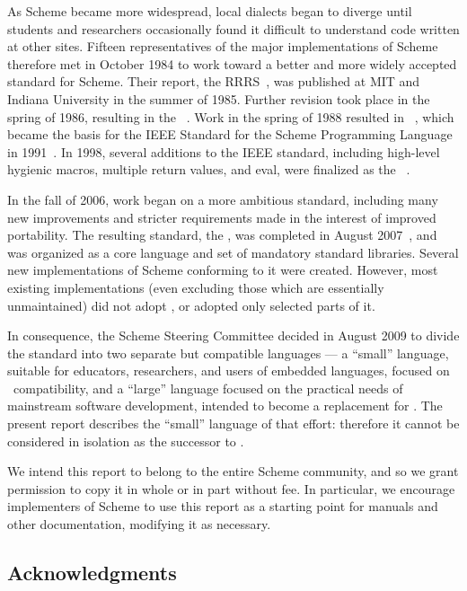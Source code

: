 \vest As Scheme became more widespread,
local dialects began to diverge until students and researchers
occasionally found it difficult to understand code written at other
sites.
Fifteen representatives of the major implementations of Scheme therefore
met in October 1984 to work toward a better and more widely accepted
standard for Scheme.
Their report, the RRRS~\cite{RRRS},
was published at MIT and Indiana University in the summer of 1985.
Further revision took place in the spring of 1986, resulting in the
\rthreers~\cite{R3RS}.
Work in the spring of 1988 resulted in \rfourrs~\cite{R4RS},
which became the basis for the
IEEE Standard for the Scheme Programming Language in 1991~\cite{IEEEScheme}.
In 1998, several additions to the IEEE standard, including high-level
hygienic macros, multiple return values, and {\cf eval}, were finalized
as the \rfivers~\cite{R5RS}.

In the fall of 2006, work began on a more ambitious standard,
including many new improvements and stricter requirements made in the
interest of improved portability.  The resulting standard, the
\rsixrs, was completed in August 2007~\cite{R6RS}, and was organized
as a core language and set of mandatory standard libraries.
Several new implementations of Scheme conforming to it were created.
However, most existing \rfivers{} implementations (even excluding those
which are essentially unmaintained) did not adopt \rsixrs, or adopted
only selected parts of it.

In consequence, the Scheme Steering Committee decided in August 2009 to divide the
standard into two separate but compatible languages --- a ``small''
language, suitable for educators, researchers, and users of embedded languages,
focused on \rfivers~compatibility, and a ``large'' language focused
on the practical needs of mainstream software development,
intended to become a replacement for \rsixrs.
The present report describes the ``small'' language of that effort:
therefore it cannot be considered in isolation as the successor
to \rsixrs.



\medskip

We intend this report to belong to the entire Scheme community, and so
we grant permission to copy it in whole or in part without fee.  In
particular, we encourage implementers of Scheme to use this report as
a starting point for manuals and other documentation, modifying it as
necessary.




\subsection*{Acknowledgments}

